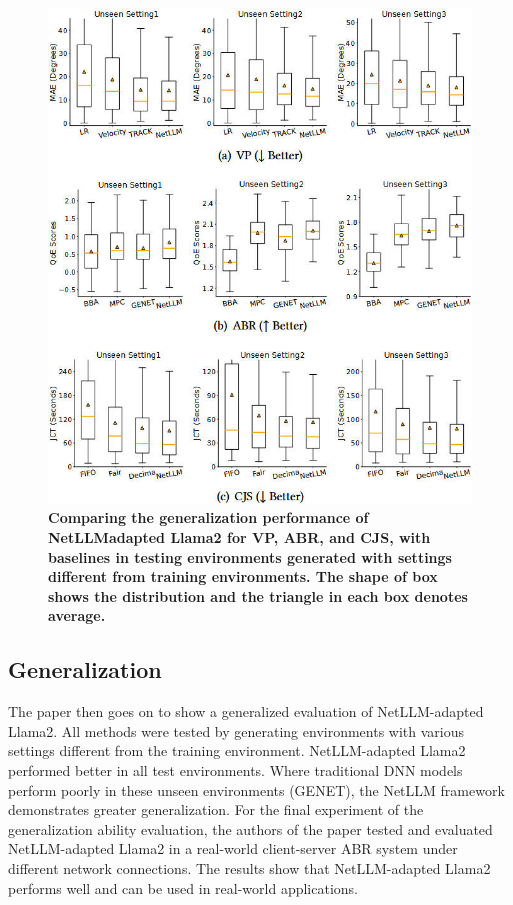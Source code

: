 \documentclass[twocolumn]{article}
\begin{document}
\begin{figure}[t]
  \centering
  \includegraphics[width=1\linewidth]{img/figure6.jpg}
  \caption{\textbf{Comparing the generalization performance of NetLLMadapted Llama2 for VP, ABR, and CJS, with baselines in testing environments generated with settings different from training environments. The shape of box shows the distribution and the triangle in each box denotes average.}}
  \label{fig:6}
\end{figure}

\subsection{Generalization}
The paper then goes on to show a generalized evaluation of NetLLM-adapted Llama2. All methods were tested by generating environments with various settings different from the training environment. NetLLM-adapted Llama2 performed better in all test environments. Where traditional DNN models perform poorly in these unseen environments (GENET), the NetLLM framework demonstrates greater generalization. For the final experiment of the generalization ability evaluation, the authors of the paper tested and evaluated NetLLM-adapted Llama2 in a real-world client-server ABR system under different network connections. The results show that NetLLM-adapted Llama2 performs well and can be used in real-world applications.
\end{document}
